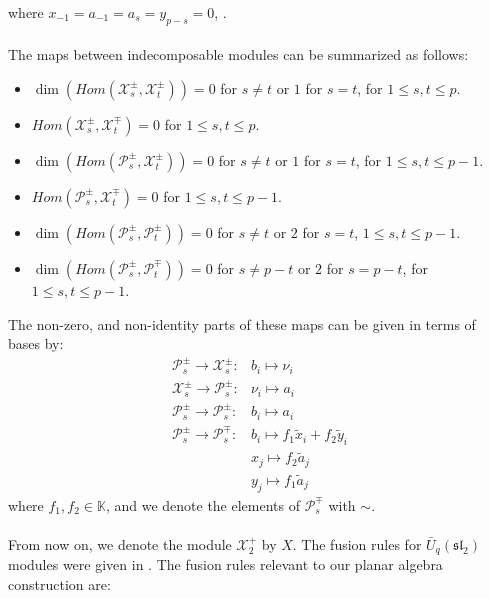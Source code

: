 \documentclass[]{article}
\begin{document}
where $x_{-1}=a_{-1}=a_{s}=y_{p-s}=0$, \cite{FGST2}.\\
\\
The maps between indecomposable modules can be summarized as follows:
\begin{itemize}
	\item $\dim\left( Hom(\mathcal{X}^{\pm}_{s},\mathcal{X}^{\pm}_{t})\right) =0$ for $s\neq t$ or $1$ for $s=t$, for $1\leq s,t\leq p$.
	\item $ Hom(\mathcal{X}^{\pm}_{s},\mathcal{X}^{\mp}_{t}) =0$ for $1\leq s,t\leq p$.
	\item $ \dim\left( Hom(\mathcal{P}^{\pm}_{s},\mathcal{X}^{\pm}_{t})\right) =0$ for $s\neq t$ or $1$ for $s=t$, for $1\leq s,t \leq p-1$.
	\item $ Hom(\mathcal{P}^{\pm}_{s},\mathcal{X}^{\mp}_{t}) =0$ for $1\leq s,t\leq p-1$.
	\item $\dim\left( Hom(\mathcal{P}^{\pm}_{s},\mathcal{P}^{\pm}_{t})\right) =0$ for $s\neq t$ or $2$ for $s=t$, $1\leq s,t\leq p-1$.
	\item $\dim\left( Hom(\mathcal{P}^{\pm}_{s},\mathcal{P}^{\mp}_{t})\right) =0$ for $s\neq p-t$ or $2$ for $s=p-t$, for $1\leq s,t\leq p-1$.
\end{itemize}
The non-zero, and non-identity parts of these maps can be given in terms of bases by:
\begin{align*}
\mathcal{P}^{\pm}_{s}\rightarrow\mathcal{X}^{\pm}_{s}:& b_{i}\mapsto \nu_{i}\\
\mathcal{X}^{\pm}_{s}\rightarrow\mathcal{P}^{\pm}_{s}:& \nu_{i}\mapsto a_{i}\\
\mathcal{P}^{\pm}_{s}\rightarrow\mathcal{P}^{\pm}_{s}:& b_{i}\mapsto a_{i}\\
\mathcal{P}^{\pm}_{s}\rightarrow\mathcal{P}^{\mp}_{s}:& b_{i}\mapsto f_{1}\tilde{x}_{i}+f_{2}\tilde{y}_{i}\\
& x_{j}\mapsto f_{2}\tilde{a}_{j}\\
& y_{j}\mapsto f_{1}\tilde{a}_{j}
\end{align*}
where $f_{1},f_{2}\in\mathbb{K}$, and we denote the elements of $\mathcal{P}^{\mp}_{s}$ with $\sim$.\\
\\
From now on, we denote the module $\mathcal{X}^{+}_{2}$ by $X$. The fusion rules for $\bar{U}_{q}(\mathfrak{sl}_{2})$ modules were given in \cite{KoSa,TsuWo}. The fusion rules relevant to our planar algebra construction are:
\end{document}

